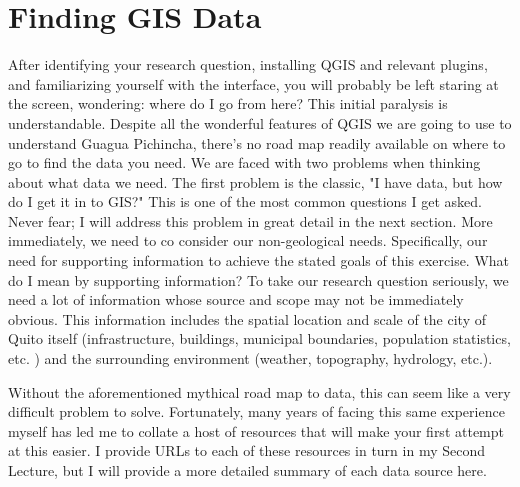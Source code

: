 \documentclass{article}
\begin{document}
\section{Finding GIS Data}

After identifying your research question, installing QGIS and relevant plugins, and familiarizing yourself with the interface, you will probably be left staring at the screen, wondering: where do I go from here? This initial paralysis is understandable. Despite all the wonderful features of QGIS we are going to use to understand Guagua Pichincha, there's no road map readily available on where to go to find the data you need. We are faced with two problems when thinking about what data we need. The first problem is the classic, "I have data, but how do I get it in to GIS?" This is one of the most common questions I get asked. Never fear; I will address this problem in great detail in the next section. More immediately, we need to co consider our non-geological needs. Specifically, our need for supporting information to achieve the stated goals of this exercise. What do I mean by supporting information? To take our research question seriously, we need a lot of information whose source and scope may not be immediately obvious. This information includes the spatial location and scale of the city of Quito itself (infrastructure, buildings, municipal boundaries, population statistics, etc. ) and the surrounding environment (weather, topography, hydrology, etc.). 

Without the aforementioned mythical road map to data, this can seem like a very difficult problem to solve. Fortunately, many years of facing this same experience myself has led me to collate a host of resources that will make your first attempt at this easier. I provide URLs to each of these resources in turn in my Second Lecture, but I will provide a more detailed summary of each data source here. 
\end{document}
